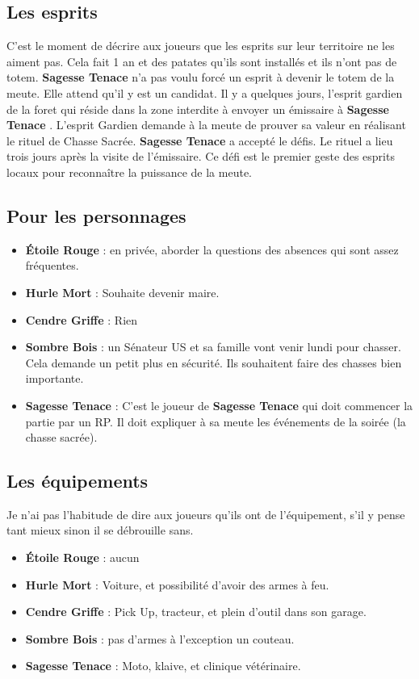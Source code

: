 \documentclass[oneside,12pt]{book}
\newcommand{\Lynn}{\textbf{Étoile Rouge} }
\newcommand{\Jessica}{\textbf{Sagesse Tenace} }
\newcommand{\Luke}{\textbf{Cendre Griffe} }
\newcommand{\Peter}{\textbf{Hurle Mort} }
\newcommand{\Leonard}{\textbf{Sombre Bois} }
\begin{document}
\begin{flushleft}
\clearpage

\subsection{Les esprits}
C'est le moment de décrire aux joueurs que les esprits sur leur territoire ne les aiment pas. Cela fait 1 an et des patates qu'ils sont installés et ils n'ont pas de totem. \Jessica n'a pas voulu forcé un esprit à devenir le totem de la meute. Elle attend qu'il y est un candidat. Il y a quelques jours, l'esprit gardien de la foret qui réside dans la zone interdite à envoyer un émissaire à \Jessica. L'esprit Gardien demande à la meute de prouver sa valeur en réalisant le rituel de Chasse Sacrée. \Jessica a accepté le défis. Le rituel a lieu trois jours après la visite de l'émissaire. Ce défi est le premier geste des esprits locaux pour reconnaître la puissance de la meute.

 \subsection{Pour les personnages}
\begin{itemize}
\item \Lynn : en privée, aborder la questions des absences qui sont assez fréquentes.
\item \Peter : Souhaite devenir maire.
\item \Luke : Rien
\item \Leonard : un Sénateur US et sa famille vont venir lundi pour chasser. Cela demande un petit plus en sécurité. Ils souhaitent faire des chasses bien importante. 
\item \Jessica : C'est le joueur de \Jessica qui doit commencer la partie par un RP. Il doit expliquer à sa meute les événements de la soirée (la chasse sacrée). 
\end{itemize}

\subsection{Les équipements}
Je n'ai pas l'habitude de dire aux joueurs qu'ils ont de l'équipement, s'il y pense tant mieux sinon il se débrouille sans.
\begin{itemize}
\item \Lynn : aucun
\item \Peter : Voiture, et possibilité d'avoir des armes à feu.
\item \Luke : Pick Up, tracteur, et plein d'outil dans son garage.
\item \Leonard : pas d'armes à l'exception un couteau.
\item \Jessica : Moto, klaive, et clinique vétérinaire. 
\end{itemize}


\end{flushleft}
\end{document}
